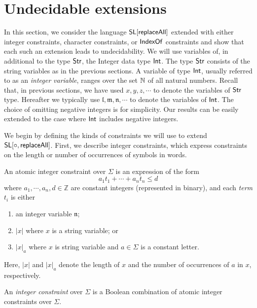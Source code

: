 
\section{Undecidable extensions}\label{sec-ext}

In this section, we consider the language $\mathsf{SL}[\mathsf{replaceAll}]$ extended with either integer constraints, character constraints, or $\mathsf{IndexOf}$ constraints and show that each such an extension leads to undecidability. 
We will use variables of, in additional to the type ${\sf Str}$, the Integer data type ${\sf Int}$. The type ${\sf Str}$ consists of the string variables as in the previous sections. A variable of type ${\sf Int}$, usually referred to as an \emph{integer variable}, ranges over the set $\mathbb{N}$ of all natural numbers. Recall that, in previous sections, we have used $x, y, z, \cdots$ to denote the variables of ${\sf Str}$ type.  Hereafter we typically use $\mathfrak{l}, \mathfrak{m}, \mathfrak{n}, \cdots$ to denote the variables of ${\sf Int}$. The
choice of omitting negative integers is for simplicity. Our
results can be easily extended to the case where ${\sf Int}$ includes negative integers.

We begin by defining the kinds of constraints we will use to extend $\mathsf{SL}[\circ,\mathsf{replaceAll}]$.
First, we describe integer constraints, which express constraints on the length or number of occurrences of symbols in words. 


\begin{definition} \label{def:intconst} 
	An atomic integer constraint over $\Sigma$ is an expression of the form
	\[a_1t_1+\cdots+a_nt_n\leq d\]
where $a_1, \cdots, a_n,d\in \mathbb{Z}$ are constant integers (represented in binary), and each \emph{term} $t_i$ is either 
	\begin{enumerate}
		\item an integer variable $\mathfrak{n}$;
		\item $|x|$ where $x$ is a  string variable; or 
		\item $|x|_a$ where $x$ is string variable and $a\in \Sigma$ is a constant letter.
	\end{enumerate}
Here, $|x|$ and $|x|_a$ denote the length of $x$ and the number of occurrences of $a$ in $x$, respectively. 

An \emph{integer constraint} over $\Sigma$ is a Boolean combination of atomic integer constraints over $\Sigma$.
\end{definition}

